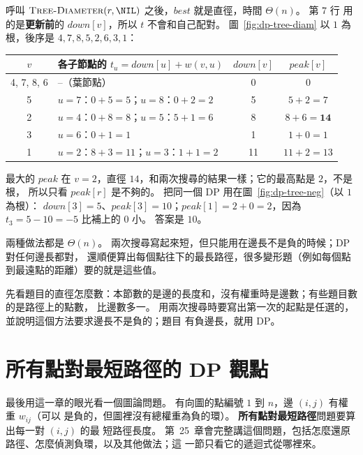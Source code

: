 呼叫 $\proc{Tree-Diameter}(r, \NIL)$ 之後，$\mathit{best}$ 就是直徑，時間 $\Theta(n)$。 第 7 行
用的是\textbf{更新前}的 $\mathit{down}[v]$，所以 $t$ 不會和自己配對。 圖~\ref{fig:dp-tree-diam}
以 $1$ 為根，後序是 $4, 7, 8, 5, 2, 6, 3, 1$：

\begin{center}
\small
\begin{tabular}{clcc}
\toprule
$v$ & 各子節點的 $t_u = \mathit{down}[u] + w(v, u)$ & $\mathit{down}[v]$ & $\mathit{peak}[v]$ \\
\midrule
4, 7, 8, 6 & --（葉節點） & 0 & 0 \\
5 & $u = 7$：$0 + 5 = 5$；$u = 8$：$0 + 2 = 2$ & 5 & $5 + 2 = 7$ \\
2 & $u = 4$：$0 + 8 = 8$；$u = 5$：$5 + 1 = 6$ & 8 & $8 + 6 = \mathbf{14}$ \\
3 & $u = 6$：$0 + 1 = 1$ & 1 & $1 + 0 = 1$ \\
1 & $u = 2$：$8 + 3 = 11$；$u = 3$：$1 + 1 = 2$ & 11 & $11 + 2 = 13$ \\
\bottomrule
\end{tabular}
\end{center}

最大的 $\mathit{peak}$ 在 $v = 2$，直徑 $14$，和兩次搜尋的結果一樣；它的最高點是 $2$，不是根，
所以只看 $\mathit{peak}[r]$ 是不夠的。 把同一個 DP 用在圖~\ref{fig:dp-tree-neg}（以 $1$ 為根）：
$\mathit{down}[3] = 5$、$\mathit{peak}[3] = 10$；$\mathit{peak}[1] = 2 + 0 = 2$，因為 $t_3 = 5 - 10 =
-5$ 比補上的 $0$ 小。 答案是 $10$。

兩種做法都是 $\Theta(n)$。 兩次搜尋寫起來短，但只能用在邊長不是負的時候；DP 對任何邊長都對，
還順便算出每個點往下的最長路徑，很多變形題（例如每個點到最遠點的距離）要的就是這些值。

\begin{examnote}
先看題目的直徑怎麼數：本節數的是邊的長度和，沒有權重時是邊數；有些題目數的是路徑上的點數，
比邊數多一。 用兩次搜尋時要寫出第一次的起點是任選的，並說明這個方法要求邊長不是負的；題目
有負邊長，就用 DP。
\end{examnote}

\section{所有點對最短路徑的 DP 觀點}
\label{sec:dp-apsp}

最後用這一章的眼光看一個圖論問題。 有向圖的點編號 $1$ 到 $n$，邊 $(i, j)$ 有權重 $w_{ij}$（可以
是負的，但圖裡沒有總權重為負的環）。 \textbf{所有點對最短路徑}問題要算出每一對 $(i, j)$ 的最
短路徑長度。 第~25~章會完整講這個問題，包括怎麼還原路徑、怎麼偵測負環，以及其他做法；這
一節只看它的遞迴式從哪裡來。


